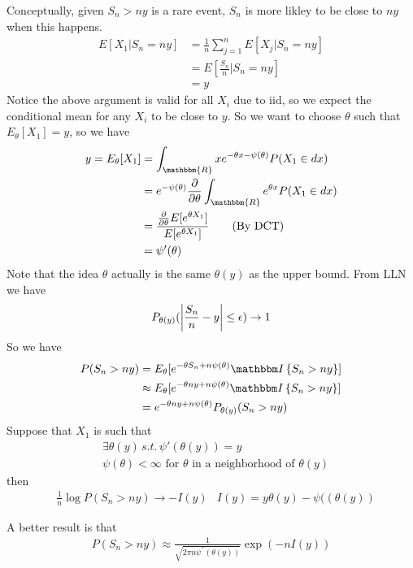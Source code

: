 Conceptually, given $S_n > ny$ is a rare event, $S_n$ is more likley to be close to $ny$ when this happens. 
    \begin{align*}
        E[X_1 | S_n = ny] 
        & = \frac{1}{n} \sum_{j=1}^n E[X_j | S_n = ny]\\
        & = E[\frac{S_n}{n} | S_n = ny] \\
        & = y
    \end{align*}
Notice the above argument is valid for all $X_i$ due to iid, so we expect the conditional mean for any $X_i$ to be close to $y$. So we want to choose $\theta$ such that $E_\theta[X_1] = y$, so we have 
    \begin{align*}
    y = E_\theta[X_1] 
    & = \int_{\mathbbm{R}}x e^{-\theta x - \psi(\theta)}P(X_1 \in dx) \\
    & = e^{-\psi(\theta)} \partiald{\theta} \int_{\mathbbm{R}} e^{\theta x} P(X_1 \in dx) \\
    & = \frac{\partiald{\theta} E[e^{\theta X_1}]}{E[e^{\theta X_1}]} \tag{By DCT}\\
    & = \psi'(\theta)
    \end{align*}
Note that the idea $\theta$ actually is the same $\theta(y)$ as the upper bound. From LLN we have 
    \begin{align*}
        P_{\theta(y)}(\left| \frac{S_n}{n}- y \right| \leq \epsilon) \to 1
    \end{align*}
So we have 
    \begin{align*}
        P(S_n > ny) 
        & = E_\theta[e^{-\theta S_n + n \psi(\theta)} \indic{S_n > ny}]\\
        & \approx E_\theta[e^{-\theta ny + n \psi(\theta)} \indic{S_n > ny}]\\
        & = e^{-\theta ny + n \psi(\theta)} P_{\theta(y)}(S_n > ny)
    \end{align*}
Suppose that $X_1$ is such that 
    \begin{align*}
        & \exists \theta(y) \, s.t. \, \psi'(\theta(y)) = y \\
        & \psi(\theta) < \infty \text{ for $\theta$ in a neighborhood of $\theta(y)$}
    \end{align*}
then 
    \begin{align*}
        & \frac{1}{n} \log P(S_n > ny) \to -I(y) & I(y) = y \theta(y) - \psi((\theta(y))
    \end{align*}
    
A better result is that 
    \begin{align*}
        P(S_n > ny) \approx \frac{1}{\sqrt{2 \pi n \psi^{''}(\theta(y))}} \exp(-n I(y))
    \end{align*}
    


